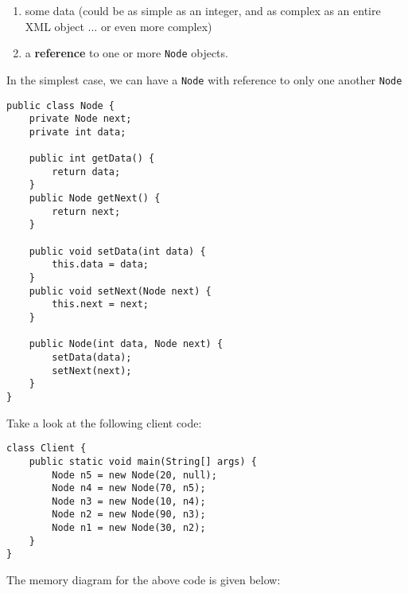 \begin{enumerate}
\item  some data (could be as simple as an integer, and as complex as an entire XML object ... or even more complex)
\item a \textbf{reference} to one or more \texttt{Node} objects.	
\end{enumerate}

In the simplest case, we can have a \texttt{Node} with reference to only one another \texttt{Node}

\begin{lstlisting}
public class Node {
	private Node next;
	private int data;
	
	public int getData() {
		return data;
	}
	public Node getNext() {
		return next;
	}
	
	public void setData(int data) {
		this.data = data;
	}
	public void setNext(Node next) {
		this.next = next;
	}
	
	public Node(int data, Node next) {
		setData(data);
		setNext(next);
	}
}
\end{lstlisting}

\newpage

Take a look at the following client code:

\begin{lstlisting}
class Client {
	public static void main(String[] args) {
		Node n5 = new Node(20, null);
		Node n4 = new Node(70, n5);
		Node n3 = new Node(10, n4);
		Node n2 = new Node(90, n3);
		Node n1 = new Node(30, n2);
	}
}
\end{lstlisting}

The memory diagram for the above code is given below:

\vskip 0.5cm

